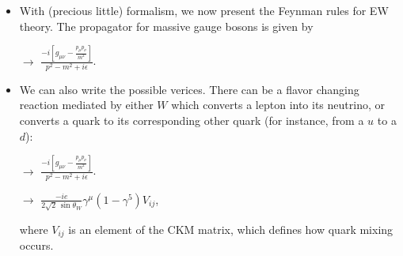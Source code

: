 \begin{itemize}
\item With (precious little) formalism, we now present the Feynman rules for EW theory. The propagator for massive gauge bosons is given by
  \begin{center}
    \hspace*{0.5cm}$\rightarrow$\hspace*{0.5cm}
    $\displaystyle \frac{-i\left[g_{\mu\nu} - \frac{p_\mu p_\nu}{m^2} \right]}{p^2 - m^2 + i\epsilon}$.
  \end{center}

\item We can also write the possible verices. There can be a flavor changing reaction mediated by either $W$ which converts a lepton into its neutrino, or converts a quark to its corresponding other quark (for instance, from a $u$ to a $d$):
  \begin{center}
    \hspace*{0.5cm}$\rightarrow$\hspace*{0.5cm}
    $\displaystyle \frac{-i\left[g_{\mu\nu} - \frac{p_\mu p_\nu}{m^2} \right]}{p^2 - m^2 + i\epsilon}$.
  \end{center}

  \begin{center}
    \hspace*{0.5cm}$\rightarrow$\hspace*{0.5cm}
    $\displaystyle \frac{-ie}{2\sqrt{2} \, \sin\theta_W}\gamma^\mu(1 - \gamma^5)V_{ij}$,
  \end{center}
  where $V_{ij}$ is an element of the CKM matrix, which defines how quark mixing occurs.


\end{itemize}
